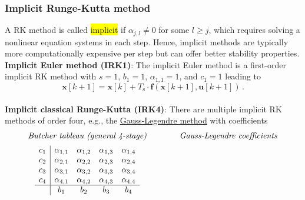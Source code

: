 \begin{frame}
    \frametitle{Implicit Runge-Kutta method}
    A RK method is called \hl{implicit} if $\alpha_{j,l}\neq 0$ for some $l\geq j$, which requires solving a nonlinear equation systems in each step. Hence, implicit methods are typically more computationally expensive per step but can offer better stability properties.\\\pause
    \textbf{Implicit Euler method (IRK1)}: The implicit Euler method is a first-order implicit RK method with $s=1$, $b_1=1$, $\alpha_{1,1}=1$, and $c_1=1$ leading to
    \begin{equation}
        \bm{x}[k+1] = \bm{x}[k] + T_\mathrm{s}\cdot \bm{f}\left(\bm{x}[k+1],\bm{u}[k+1]\right)\,.
        \label{eq:IRK1}
    \end{equation}
    \\\pause
    \textbf{Implicit classical Runge-Kutta (IRK4)}: There are multiple implicit RK methods of order four, e.g., the \href{https://en.wikipedia.org/wiki/Gauss-Legendre_method}{Gauss-Legendre method} with  coefficients
    \[
        \begin{array}{c@{\qquad\qquad}c}
            \text{\textit{Butcher tableau (general 4-stage)}}
             &
            \text{\textit{Gauss-Legendre coefficients}}
            \\[1.2ex]
            \begin{array}{c|cccc}
                c_1
                    & \alpha_{1,1}
                    & \alpha_{1,2}
                    & \alpha_{1,3}
                    & \alpha_{1,4}
                \\
                c_2
                    & \alpha_{2,1}
                    & \alpha_{2,2}
                    & \alpha_{2,3}
                    & \alpha_{2,4}
                \\
                c_3
                    & \alpha_{3,1}
                    & \alpha_{3,2}
                    & \alpha_{3,3}
                    & \alpha_{3,4}
                \\
                c_4
                    & \alpha_{4,1}
                    & \alpha_{4,2}
                    & \alpha_{4,3}
                    & \alpha_{4,4}
                \\ \hline
                    &
                b_1 & b_2          & b_3 & b_4
            \end{array}
             &
            \begin{array}{c|rrrr}

\end{array}
\end{array}\]
\end{frame}
